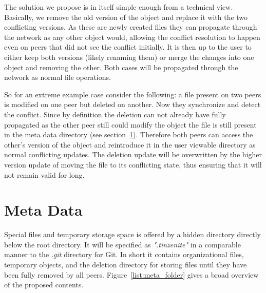 The solution we propose is in itself simple enough from a technical view.
Basically, we remove the old version of the object and replace it with the two conflicting versions.
As these are newly created files they can propagate through the network as any other object would, allowing the conflict resolution to happen even on peers that did not see the conflict initially.
It is then up to the user to either keep both versions (likely renaming them) or merge the changes into one object and removing the other.
Both cases will be propagated through the network as normal file operations.

So for an extreme example case consider the following: a file present on two peers is modified on one peer but deleted on another.
Now they synchronize and detect the conflict.
Since by definition the deletion can not already have fully propagated as the other peer still could modify the object the file is still present in the meta data directory (see section~\ref{sec:Meta Data}).
Therefore both peers can access the other's version of the object and reintroduce it in the user viewable directory as normal conflicting updates.
The deletion update will be overwritten by the higher version update of moving the file to its conflicting state, thus ensuring that it will not remain valid for long.

\section{Meta Data}
\label{sec:Meta Data}

Special files and temporary storage space is offered by a hidden directory directly below the root directory.
It will be specified as \textit{".tinzenite"} in a comparable manner to the \textit{.git} directory for Git.
In short it contains organizational files, temporary objects, and the deletion directory for storing files until they have been fully removed by all peers.
Figure~\ref{list:meta_folder} gives a broad overview of the proposed contents.


